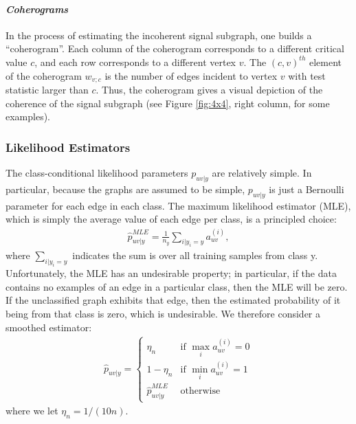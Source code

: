 \documentclass[10pt,journal,cspaper,compsoc]{IEEEtran}
\providecommand{\mh}[1]{\hat{#1}}
\begin{document}
\paragraph{\emph{Coherograms}}

In the process of estimating the incoherent signal subgraph, one builds a ``coherogram''.  Each column of the coherogram corresponds to a different critical value $c$, and each row corresponds to a different vertex $v$.  The $(c,v)^{th}$ element of the coherogram $w_{v;c}$ is the number of edges incident to vertex $v$ with test statistic larger than $c$.  Thus, the coherogram gives a visual depiction of the coherence of the signal subgraph (see Figure \ref{fig:4x4}, right column, for some examples).


\subsubsection{Likelihood Estimators} %
\label{sub:likelihood}

The class-conditional likelihood parameters $p_{uv|y}$ are relatively simple.  In particular, because the graphs are assumed to be simple, $p_{uv|y}$ is just a Bernoulli parameter for each edge in each class.  The maximum likelihood estimator (MLE), which is simply the average value of each edge per class, is a principled choice:
\begin{align}
\mh{p}_{uv|y}^{MLE} = \frac{1}{n_y} \sum_{i | y_i = y} a_{uv}^{(i)},
\end{align}
where $\sum_{i | y_i=y}$ indicates the sum is over all training samples from class y. Unfortunately, the MLE has an undesirable property; in particular, if the data contains no examples of an edge in a particular class, then the MLE will be zero.  If the unclassified graph exhibits that edge, then the estimated probability of it being from that class is zero, which is undesirable. We therefore consider a smoothed estimator:
\begin{align} \label{eq:lik}
\mh{p}_{uv|y} = 
\begin{cases}
\eta_n & \text{if } \max_i a_{uv}^{(i)}=0 \\
1- \eta_n & \text{if } \min_i a_{uv}^{(i)}=1 \\
\mh{p}_{uv|y}^{MLE} & \text{otherwise}
\end{cases}
\end{align}
where we let $\eta_n=1/(10n)$.  
\end{document}
